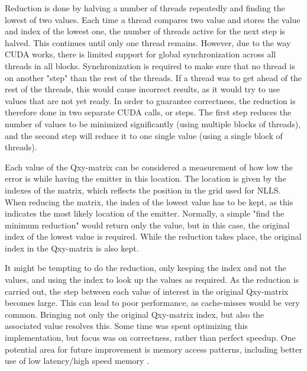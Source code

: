 \documentclass[10pt,a4paper]{book}
\begin{document}
Reduction is done by halving a number of threads repeatedly and finding the lowest of two values. Each time a thread compares two value and stores the value and index of the lowest one, the number of threads active for the next step is halved. This continues until only one thread remains. However, due to the way \gls{CUDA} works, there is limited support for global synchronization across all threads in all blocks. Synchronization is required to make sure that no thread is on another "step" than the rest of the threads. If a thread was to get ahead of the rest of the threads, this would cause incorrect results, as it would try to use values that are not yet ready. In order to  guarantee correctness, the reduction is therefore done in two separate \gls{CUDA} calls, or steps. The first step reduces the number of values to be minimized significantly (using multiple blocks of threads), and the second step will reduce it to one single value (using a single block of threads). 


Each value of the Qxy-matrix can be considered a measurement of how low the error is while having the emitter in this location. The location is given by the indexes of the matrix, which reflects the position in the grid used for \gls{NLLS}. When reducing the matrix, the index of the lowest value has to be kept, as this indicates the most likely location of the emitter. Normally, a simple "find the minimum reduction" would return only the value, but in this case, the original index of the lowest value is required. While the reduction takes place, the original index in the Qxy-matrix is also kept.

It might be tempting to do the reduction, only keeping the index and not the values, and using the index to look up the values as required. As the reduction is carried out, the step between each value of interest in the original Qxy-matrix becomes large. This can lead to poor performance, as cache-misses would be very common. Bringing not only the original Qxy-matrix index, but also the associated value resolves this. Some time was spent optimizing this implementation, but focus was on correctness, rather than perfect speedup. One potential area for future improvement is memory access patterns, including better use of low latency/high speed memory \cite{harris2007optimizing}. 


\newpage


\section{}
\end{document}
